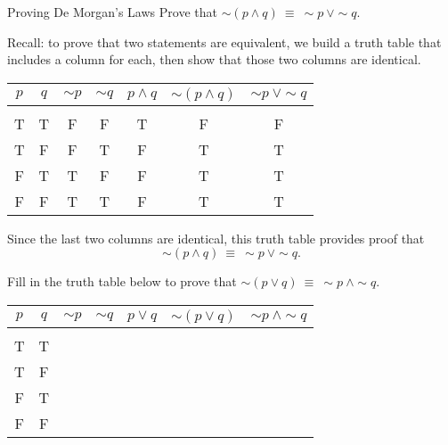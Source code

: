 \begin{example}[https://www.youtube.com/watch?v=FvBhN-V3nRg]{Proving De Morgan's Laws}
Prove that $\sim (p \wedge q)\ \equiv\ \sim p\ \vee \sim q$.

\sol
Recall: to prove that two statements are equivalent, we build a truth table that includes a column for each, then show that those two columns are identical.
\begin{center}
\begin{tabular}{|c c c c c c c|}
\hline
$p$ & $q$ & $\sim p$ & $\sim q$ & $p \wedge q$ & $\sim (p \wedge q)$ & $\sim p\ \vee \sim q$\\
\hline
& & & & & & \\
T & T & F & F & T & F & F\\
T & F & F & T & F & T & T\\
F & T & T & F & F & T & T\\
F & F & T & T & F & T & T\\
\hline
\end{tabular}
\end{center}

Since the last two columns are identical, this truth table provides proof that \[\sim (p \wedge q)\ \equiv\ \sim p\ \vee \sim q.\]
\end{example}

\begin{try}
Fill in the truth table below to prove that $\sim (p \vee q)\ \equiv\ \sim p\ \wedge \sim q$.
\begin{center}
\begin{tabular}{|c c c c c c c|}
\hline
$p$ & $q$ & $\sim p$ & $\sim q$ & $p \vee q$ & $\sim (p \vee q)$ & $\sim p\ \wedge \sim q$\\
\hline
& & & & & & \\
T & T & & & & & \\
T & F & & & & & \\
F & T & & & & & \\
F & F & & & & & \\
\hline
\end{tabular}
\end{center}
\end{try}
\vfill
\pagebreak

